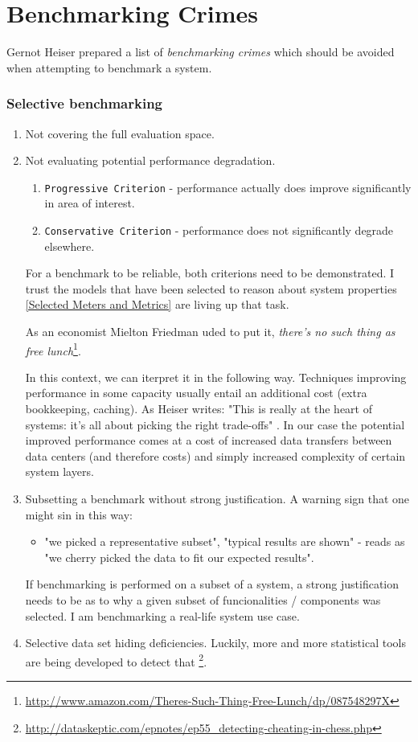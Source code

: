 \documentclass{uvamscse}
\begin{document}
\section{Benchmarking Crimes}

Gernot Heiser prepared a list \cite{GerHeiBench} of \textit{benchmarking crimes} which should be avoided when attempting to benchmark a system.

\subsubsection{Selective benchmarking}
\begin{enumerate}
  \item Not covering the full evaluation space.
  \item Not evaluating potential performance degradation.
    \begin{enumerate}
      \item \texttt{Progressive Criterion} - performance actually does improve significantly in area of interest.
      \item \texttt{Conservative Criterion} - performance does not significantly degrade elsewhere.
    \end{enumerate}
    For a benchmark to be reliable, both criterions need to be demonstrated. I trust the models that have been selected to reason about system properties \ref{Selected Meters and Metrics} are living up that task.

    As an economist Mielton Friedman uded to put it, \textit{there's no such thing as free lunch}\footnote{\url{http://www.amazon.com/Theres-Such-Thing-Free-Lunch/dp/087548297X}}.

    In this context, we can iterpret it in the following way. Techniques improving performance in some capacity usually entail an additional cost (extra bookkeeping, caching). As Heiser writes: "This is really at the heart of systems: it's all about picking the right trade-offs" \cite{GerHeiBench}. In our case the potential improved performance comes at a cost of increased data transfers between data centers (and therefore costs) and simply increased complexity of certain system layers.
  \item Subsetting a benchmark without strong justification. A warning sign that one might sin in this way:
    \begin{itemize}
      \item "we picked a representative subset", "typical results are shown" - reads as "we cherry picked the data to fit our expected results".
    \end{itemize}
    If benchmarking is performed on a subset of a system, a strong justification needs to be as to why a given subset of funcionalities / components was selected. I am benchmarking a real-life system use case.
  \item Selective data set hiding deficiencies. Luckily, more and more statistical tools are being developed to detect that \footnote{\url{http://dataskeptic.com/epnotes/ep55_detecting-cheating-in-chess.php}}.
\end{enumerate}
\end{document}
